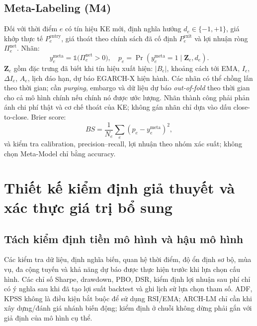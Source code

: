 \documentclass[12pt,a4paper,oneside]{article}
\newcommand{\Ind}{\mathbb{1}}
\begin{document}
\subsection{Meta-Labeling (M4)}
Đối với thời điểm $e$ có tín hiệu KE mới, định nghĩa hướng $d_e\in\{-1,+1\}$, giá khớp thực tế $P_e^{\mathrm{entry}}$, giá thoát theo chính sách đã cố định $P_e^{\mathrm{exit}}$ và lợi nhuận ròng $\Pi_e^{\mathrm{net}}$. Nhãn:
\begin{equation}
y_e^{\mathrm{meta}}=\Ind\big(\Pi_e^{\mathrm{net}}>0\big),\quad
p_e=\Pr(y_e^{\mathrm{meta}}=1\mid\bm Z_e,d_e).
\end{equation}
$\bm Z_e$ gồm đặc trưng đã biết khi tín hiệu xuất hiện: $|B_e|$, khoảng cách tới EMA, $I_e$, $\Delta I_e$, $A_e$, lịch đáo hạn, dự báo EGARCH-X hiện hành. Các nhãn có thể chồng lấn theo thời gian; cần \emph{purging}, embargo và dữ liệu dự báo \emph{out-of-fold} theo thời gian cho cả mô hình chính nếu chính nó được ước lượng. Nhãn thành công phải phản ánh chi phí thật và cơ chế thoát của KE; không gán nhãn chỉ dựa vào dấu close-to-close. Brier score:
\begin{equation}
BS=\frac{1}{N_e}\sum_e(p_e-y_e^{\mathrm{meta}})^2,
\end{equation}
và kiểm tra calibration, precision--recall, lợi nhuận theo nhóm xác suất; không chọn Meta-Model chỉ bằng accuracy.

\section{Thiết kế kiểm định giả thuyết và xác thực giá trị bổ sung}
\subsection{Tách kiểm định tiền mô hình và hậu mô hình}
Các kiểm tra dữ liệu, định nghĩa biến, quan hệ thời điểm, độ ổn định sơ bộ, mùa vụ, đa cộng tuyến và khả năng dự báo được thực hiện trước khi lựa chọn cấu hình. Các chỉ số Sharpe, drawdown, PBO, DSR, kiểm định lợi nhuận sau phí chỉ có ý nghĩa sau khi đã tạo lợi suất backtest và ghi lịch sử lựa chọn tham số. ADF, KPSS không là điều kiện bắt buộc để sử dụng RSI/EMA; ARCH-LM chỉ cần khi xây dựng/đánh giá nhánh biến động; kiểm định ở chuỗi không dừng phải gắn với giả định của mô hình cụ thể.
\end{document}
